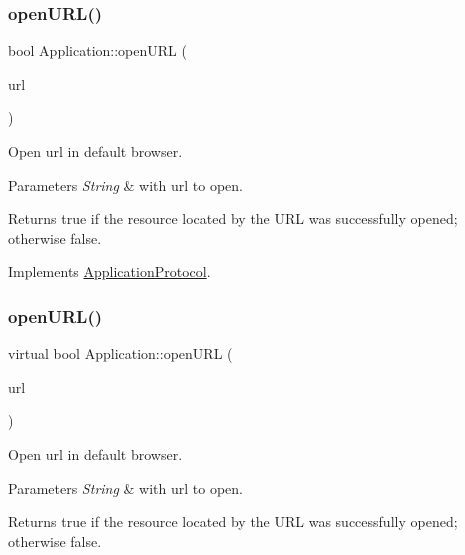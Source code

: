 \subsubsection{\texorpdfstring{open\+U\+R\+L()}{openURL()}\hspace{0.1cm}{\footnotesize\ttfamily [4/12]}}
{\footnotesize\ttfamily bool Application\+::open\+U\+RL (\begin{DoxyParamCaption}\item[{const std\+::string \&}]{url }\end{DoxyParamCaption})\hspace{0.3cm}{\ttfamily [virtual]}}



Open url in default browser. 


\begin{DoxyParams}{Parameters}
{\em String} & with url to open. \\
\hline
\end{DoxyParams}
\begin{DoxyReturn}{Returns}
true if the resource located by the U\+RL was successfully opened; otherwise false. 
\end{DoxyReturn}


Implements \hyperlink{classApplicationProtocol_a152a977b301a90253ec5a6533b2e8e04}{Application\+Protocol}.

\mbox{\label{classApplication_a72b67fcc1ab0875ee67a95167c76db61}} 
\subsubsection{\texorpdfstring{open\+U\+R\+L()}{openURL()}\hspace{0.1cm}{\footnotesize\ttfamily [5/12]}}
{\footnotesize\ttfamily virtual bool Application\+::open\+U\+RL (\begin{DoxyParamCaption}\item[{const std\+::string \&}]{url }\end{DoxyParamCaption})\hspace{0.3cm}{\ttfamily [virtual]}}



Open url in default browser. 


\begin{DoxyParams}{Parameters}
{\em String} & with url to open. \\
\hline
\end{DoxyParams}
\begin{DoxyReturn}{Returns}
true if the resource located by the U\+RL was successfully opened; otherwise false. 
\end{DoxyReturn}


